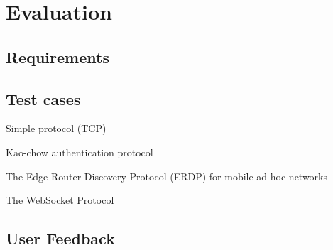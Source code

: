 \chapter{Evaluation}
\label{chap:evaluation}

\section{Requirements}

\section{Test cases}

Simple protocol (TCP)

Kao-chow authentication protocol

The Edge Router Discovery Protocol (ERDP) for mobile ad-hoc networks

The WebSocket Protocol

\section{User Feedback}
